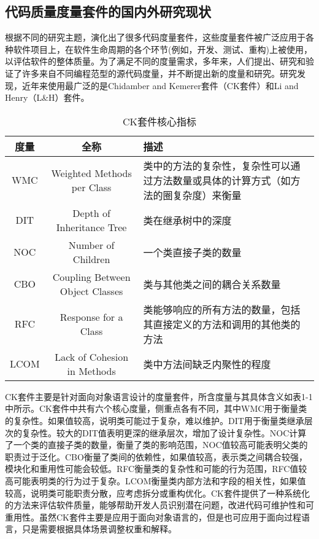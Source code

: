 \subsection{代码质量度量套件的国内外研究现状}

根据不同的研究主题，演化出了很多代码度量套件，这些度量套件被广泛应用于各种软件项目上，在软件生命周期的各个环节(例如，开发、测试、重构)上被使用，以评估软件的整体质量。为了满足不同的度量需求，多年来，人们提出、研究和验证了许多来自不同编程范型的源代码度量，并不断提出新的度量和研究。研究发现\cite{Ardito2020}，近年来使用最广泛的是Chidamber and Kemerer套件（CK套件）和Li and Henry（L&H）套件。


\begin{table}[htbp]
\caption{CK套件核心指标}
\vspace{0.5em}\centering\wuhao
\begin{tabular}{ccp{7.5cm}}
\toprule
度量 & 全称 & 描述 \\
\midrule
WMC & Weighted Methods per Class & 类中的方法的复杂性，复杂性可以通过方法数量或具体的计算方式（如方法的圈复杂度）来衡量 \\
DIT & Depth of Inheritance Tree & 类在继承树中的深度 \\
NOC & Number of Children & 一个类直接子类的数量 \\
CBO & Coupling Between Object Classes & 类与其他类之间的耦合关系数量  \\
RFC & Response for a Class & 类能够响应的所有方法的数量，包括其直接定义的方法和调用的其他类的方法  \\
LCOM & Lack of Cohesion in Methods & 类中方法间缺乏内聚性的程度  \\
\bottomrule
\end{tabular}
\end{table}

CK套件主要是针对面向对象语言设计的度量套件，所含度量与其具体含义如表1-1中所示。CK套件中共有六个核心度量，侧重点各有不同，其中WMC用于衡量类的复杂性。如果值较高，说明类可能过于复杂，难以维护。DIT用于衡量类继承层次的复杂性。较大的DIT值表明更深的继承层次，增加了设计复杂性。NOC计算了一个类的直接子类的数量，衡量了类的影响范围，NOC值较高可能表明父类的职责过于泛化。CBO衡量了类间的依赖性，如果值较高，表示类之间耦合较强，模块化和重用性可能会较低。RFC衡量类的复杂性和可能的行为范围，RFC值较高可能表明类的行为过于复杂。LCOM衡量类内部方法和字段的相关性，如果值较高，说明类可能职责分散，应考虑拆分或重构优化。CK套件提供了一种系统化的方法来评估软件质量，能够帮助开发人员识别潜在问题，改进代码可维护性和可重用性。虽然CK套件主要是应用于面向对象语言的，但是也可应用于面向过程语言，只是需要根据具体场景调整权重和解释。

